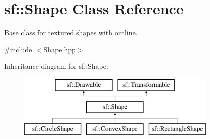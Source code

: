 \hypertarget{classsf_1_1_shape}{}\section{sf\+:\+:Shape Class Reference}
\label{classsf_1_1_shape}


Base class for textured shapes with outline.  




{\ttfamily \#include $<$Shape.\+hpp$>$}

Inheritance diagram for sf\+:\+:Shape\+:\begin{figure}[H]
\begin{center}
\leavevmode
\includegraphics[height=3.000000cm]{classsf_1_1_shape}
\end{center}
\end{figure}

